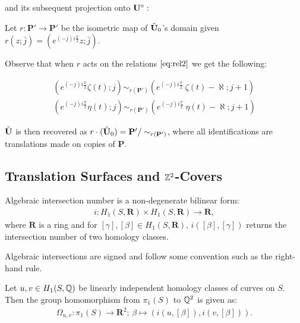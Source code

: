 \documentclass[]{article}
\begin{document}
\noindent and its subsequent projection onto $\mathbf{U}^\circ:$



\begin{Def}
Let $r:\mathbf{P}'\rightarrow\mathbf{P}'$ be the isometric map of $\tilde{\mathbf{U}}_0$'s domain given  $r(z;\bar{j})=(e^{(-j)i\frac{\pi}{2}}z;\bar{j})$.
\end{Def}

Observe that when $r$ acts on the relations $\eqref{eq:rel2}$ we get the following:

\begin{equation}
\begin{split}
(e^{(-j)i\frac{\pi}{2}}\zeta(t);j)\sim_{r(\mathbf{P'})}(e^{(-j)i\frac{\pi}{2}}~{\zeta(t)-\aleph};j+1)\\
(e^{(-j)i\frac{\pi}{2}}\eta(t);j)\sim_{r(\mathbf{P'})}(e^{(-j)i\frac{\pi}{2}}~{\eta(t)-\aleph};j+1)
\end{split}
\end{equation}

$\tilde{\mathbf{U}}$ is then recovered as $r\cdot(\tilde{\mathbf{U}}_0)=\mathbf{P'}/\sim_{r(\mathbf{P}')}$, where all identifications are translations made on copies of $\mathbf{P}$.

\subsection{Translation Surfaces and $\mathbb{Z}^2$-Covers}


\begin{Def}
Algebraic intersection number is a non-degenerate bilinear form:
\begin{align*}
i:H_1(S,\mathbf{R})\times H_1(S,\mathbf{R})\rightarrow\mathbf{R},
\end{align*}
where $\mathbf{R}$ is a ring and for $[\gamma],[\beta]\in H_1(S,\mathbf{R})$, $i([\beta],[\gamma])$ returns the intersection number of two homology classes.
\end{Def}
Algebraic intersections are signed and follow some convention such as the right-hand rule.

\begin{Def}
Let $u,v\in H_1(S,\mathbb{Q})$ be linearly independent homology classes of curves on $S$. Then the group homomorphism from $\pi_1(S)$ to $\mathbb{Q}^2$ is given as:
\begin{align*}
\Omega_{u,v}:\pi_1(S)\rightarrow \mathbf{R}^2 \text{; } \beta\mapsto(i(u,[\beta]),i(v,[\beta])).
\end{align*}
\end{Def}
\end{document}
